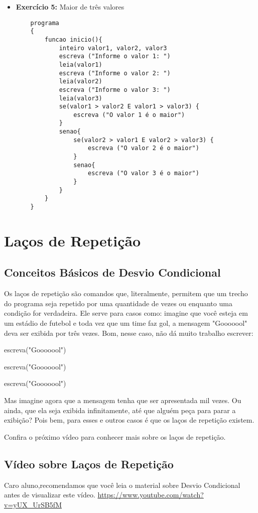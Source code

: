 \documentclass{article}
\begin{document}
\begin{itemize}
    \item \textbf{Exercício 5:} Maior de três valores
    \begin{lstlisting}
    programa
    {
        funcao inicio(){
            inteiro valor1, valor2, valor3
            escreva ("Informe o valor 1: ")
            leia(valor1)
            escreva ("Informe o valor 2: ")
            leia(valor2)
            escreva ("Informe o valor 3: ")
            leia(valor3)
            se(valor1 > valor2 E valor1 > valor3) {
                escreva ("O valor 1 é o maior")
            }
            senao{
                se(valor2 > valor1 E valor2 > valor3) {
                    escreva ("O valor 2 é o maior")
                }
                senao{
                    escreva ("O valor 3 é o maior")
                }
            }
        }
    }
    \end{lstlisting}
\end{itemize}


\section{Laços de Repetição}
\subsection{Conceitos Básicos de Desvio Condicional}
Os laços de repetição são comandos que, literalmente, permitem que um trecho do programa seja repetido por uma quantidade de vezes ou enquanto uma condição for verdadeira. Ele serve para casos como: imagine que você esteja em um estádio de futebol e toda vez que um time faz gol, a mensagem "Gooooool" deva ser exibida por três vezes. Bom, nesse caso, não dá muito trabalho escrever:

escreva("Gooooool")

escreva("Gooooool")

escreva("Gooooool")

Mas imagine agora que a mensagem tenha que ser apresentada mil vezes. Ou ainda, que ela seja exibida infinitamente, até que alguém peça para parar a exibição? Pois bem, para esses e outros casos é que os laços de repetição existem.

Confira o próximo vídeo para conhecer mais sobre os laços de repetição.
\subsection{Vídeo sobre Laços de Repetição}
Caro aluno,recomendamos que você leia o material sobre Desvio Condicional antes de visualizar este vídeo.
\href{https://www.youtube.com/watch?v=yUX_UrSB5fM}{https://www.youtube.com/watch?v=yUX_UrSB5fM}
\end{document}
